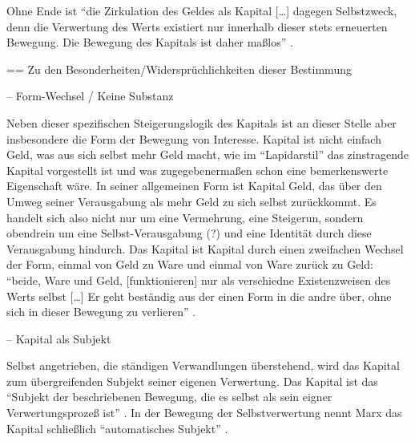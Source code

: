 \documentclass[12pt,
               DIV13,
               paper=a4,
               twoside=false,
               onehalfspacing,
               bibliography=totoc,
               toc=graduated,
               draft,
               ]{scrartcl}
\newcommand{\lips}{\dots\unkern}
\newcommand{\pc}[2]{\parencite[#1]{#2}}
\newcommand{\zn}[3]{\parencite[#1, zit. nach][#2]{#3}}
\newcommand{\worries}[1]{\ifdraft{\textcolor{blue}{\texttt{(#1)}}}{}}
\begin{document}
Ohne Ende ist "`die Zirkulation des Geldes als Kapital [\lips] dagegen
Selbstzweck, denn die Verwertung des Werts existiert nur innerhalb
dieser stets erneuerten Bewegung. Die Bewegung des Kapitals ist daher
maßlos"' \pc{167}{kap}.


== Zu den Besonderheiten/Widersprüchlichkeiten dieser Bestimmung

-- Form-Wechsel / Keine Substanz

Neben dieser spezifischen Steigerungslogik des Kapitals ist an dieser
Stelle aber insbesondere die Form der Bewegung von Interesse. Kapital
ist nicht einfach Geld, was aus sich selbst mehr Geld macht, wie im
"`Lapidarstil"' \pc{170}{kap} das zinstragende Kapital vorgestellt ist
und was zugegebenermaßen schon eine bemerkenswerte Eigenschaft wäre.
In seiner allgemeinen Form ist Kapital Geld, das über den Umweg seiner
Verausgabung als mehr Geld zu sich selbst zurückkommt. Es handelt sich
also nicht nur um eine Vermehrung, eine Steigerun, sondern obendrein
um eine Selbst-Verausgabung (?) und eine Identität durch diese
Verausgabung hindurch. Das Kapital ist Kapital durch einen zweifachen
Wechsel der Form, einmal von Geld zu Ware und einmal von Ware zurück
zu Geld: "`beide, Ware und Geld, [funktionieren] nur als verschiedne
Existenzweisen des Werts selbst [\lips] Er geht beständig aus der
einen Form in die andre über, ohne sich in dieser Bewegung zu
verlieren"' \pc{S. 168 f.}{kap}.




-- Kapital als Subjekt

Selbst angetrieben, die ständigen Verwandlungen überstehend, wird das
Kapital zum übergreifenden Subjekt seiner eigenen Verwertung. Das
Kapital ist das "`Subjekt der beschriebenen Bewegung, die es selbst
als sein eigner Verwertungsprozeß ist"' \zn{Marx}{181}{reichelt}. In
der Bewegung der Selbstverwertung nennt Marx das Kapital schließlich
"`automatisches Subjekt"' \pc{169}{kap}.
\end{document}
